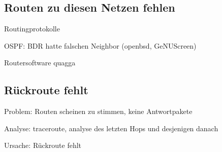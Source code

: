 \subsection{Routen zu diesen Netzen fehlen}
\label{sec:routen fehlen}

\begin{notes}
\item Routingprotokolle
\item OSPF: BDR hatte falschen Neighbor (openbsd, GeNUScreen)
\item Routersoftware quagga
\end{notes}

\subsection{Rückroute fehlt}
\label{sec:rueckroute-fehlt}

\begin{notes}
\item Problem: Routen scheinen zu stimmen, keine Antwortpakete
\item Analyse: traceroute, analyse des letzten Hops und desjenigen danach
\item Ursache: Rückroute fehlt
\end{notes}




